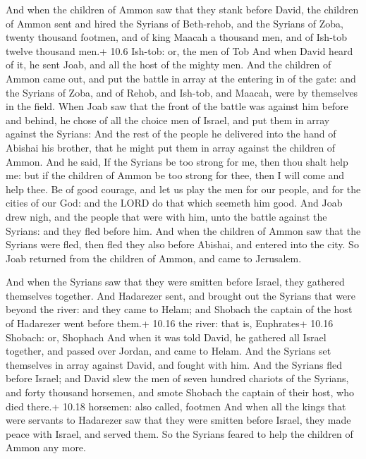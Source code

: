  And when the children of Ammon saw that they stank before
David, the children of Ammon sent and hired the Syrians of Beth-rehob,
and the Syrians of Zoba, twenty thousand footmen, and of king Maacah a
thousand men, and of Ish-tob twelve thousand men.+ 10.6 Ish-tob: or, the
men of Tob  And when David heard of it, he sent Joab, and
all the host of the mighty men.  And the children of Ammon
came out, and put the battle in array at the entering in of the gate:
and the Syrians of Zoba, and of Rehob, and Ish-tob, and Maacah, were by
themselves in the field.  When Joab saw that the front of
the battle was against him before and behind, he chose of all the choice
men of Israel, and put them in array against the Syrians: 
And the rest of the people he delivered into the hand of Abishai his
brother, that he might put them in array against the children of Ammon.
 And he said, If the Syrians be too strong for me, then
thou shalt help me: but if the children of Ammon be too strong for thee,
then I will come and help thee.  Be of good courage, and
let us play the men for our people, and for the cities of our God: and
the LORD do that which seemeth him good.  And Joab drew
nigh, and the people that were with him, unto the battle against the
Syrians: and they fled before him.  And when the children
of Ammon saw that the Syrians were fled, then fled they also before
Abishai, and entered into the city. So Joab returned from the children
of Ammon, and came to Jerusalem.

 And when the Syrians saw that they were smitten before
Israel, they gathered themselves together.  And Hadarezer
sent, and brought out the Syrians that were beyond the river: and they
came to Helam; and Shobach the captain of the host of Hadarezer went
before them.+ 10.16 the river: that is, Euphrates+ 10.16 Shobach: or,
Shophach  And when it was told David, he gathered all
Israel together, and passed over Jordan, and came to Helam. And the
Syrians set themselves in array against David, and fought with him.
 And the Syrians fled before Israel; and David slew the men
of seven hundred chariots of the Syrians, and forty thousand horsemen,
and smote Shobach the captain of their host, who died there.+ 10.18
horsemen: also called, footmen  And when all the kings that
were servants to Hadarezer saw that they were smitten before Israel,
they made peace with Israel, and served them. So the Syrians feared to
help the children of Ammon any more.


